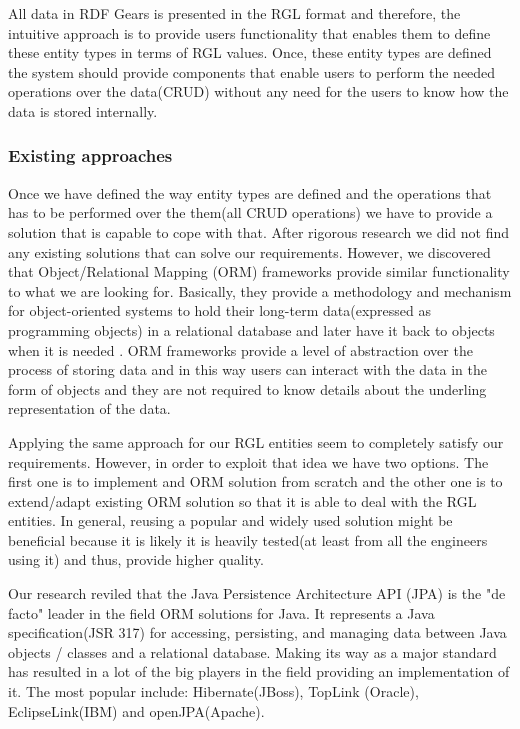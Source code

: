 \documentclass[a4paper, notitlepage]{article}
\begin{document}
All data in RDF Gears is presented in the RGL format and therefore, the intuitive approach is to provide users functionality that enables them to define these entity types in terms of RGL values. Once, these entity types are defined the system should provide components that enable users to perform the needed operations over the data(CRUD) without any need for the users to know how the data is stored internally.

\subsubsection{Existing approaches}

Once we have defined the way entity types are defined and the operations that has to be performed over the them(all CRUD operations) we have to provide a solution that is capable to cope with that. After rigorous research we did not find any existing solutions that can solve our requirements. However, we discovered that Object/Relational Mapping (ORM) frameworks provide similar functionality to what we are looking for. Basically, they provide a methodology and mechanism for object-oriented systems to hold their long-term data(expressed as programming objects) in a relational database and later have it back to objects when it is needed \cite{Neil}. ORM frameworks provide a level of abstraction over the process of storing data and in this way users can interact with the data in the form of objects and they are not required to know details about the underling representation of the data. 

Applying the same approach for our RGL entities seem to completely satisfy our requirements. However, in order to exploit that idea we have two options. The first one is to implement and ORM solution from scratch and the other one is to extend/adapt existing ORM solution so that it is able to deal with the RGL entities. In general, reusing a popular and widely used solution might be beneficial because it is likely it is heavily tested(at least from all the engineers using it) and thus, provide higher quality. 

Our research reviled that the Java Persistence Architecture API (JPA) is the "de facto" leader in the field ORM solutions for Java. It represents a Java specification(JSR 317) for accessing, persisting, and managing data between Java objects / classes and a relational database. Making its way as a major standard has resulted in a lot of the big players in the field providing an implementation of it. The most popular include: Hibernate(JBoss), TopLink (Oracle), EclipseLink(IBM) and openJPA(Apache). 
\end{document}
